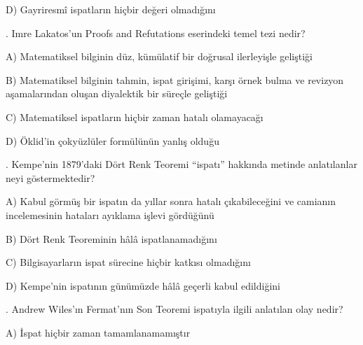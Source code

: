 \par\noindent\hspace*{1.6em}D) Gayriresmî ispatların hiçbir değeri olmadığını

\par\smallskip{}. Imre Lakatos’un Proofs and Refutations eserindeki temel tezi nedir?

\par\noindent\hspace*{1.6em}A) Matematiksel bilginin düz, kümülatif bir doğrusal ilerleyişle geliştiği

\par\noindent\hspace*{1.6em}B) Matematiksel bilginin tahmin, ispat girişimi, karşı örnek bulma ve revizyon aşamalarından oluşan diyalektik bir süreçle geliştiği

\par\noindent\hspace*{1.6em}C) Matematiksel ispatların hiçbir zaman hatalı olamayacağı

\par\noindent\hspace*{1.6em}D) Öklid’in çokyüzlüler formülünün yanlış olduğu

\par\smallskip{}. Kempe’nin 1879’daki Dört Renk Teoremi “ispatı” hakkında metinde anlatılanlar neyi göstermektedir?

\par\noindent\hspace*{1.6em}A) Kabul görmüş bir ispatın da yıllar sonra hatalı çıkabileceğini ve camianın incelemesinin hataları ayıklama işlevi gördüğünü

\par\noindent\hspace*{1.6em}B) Dört Renk Teoreminin hâlâ ispatlanamadığını

\par\noindent\hspace*{1.6em}C) Bilgisayarların ispat sürecine hiçbir katkısı olmadığını

\par\noindent\hspace*{1.6em}D) Kempe’nin ispatının günümüzde hâlâ geçerli kabul edildiğini

\par\smallskip{}. Andrew Wiles’ın Fermat’nın Son Teoremi ispatıyla ilgili anlatılan olay nedir?

\par\noindent\hspace*{1.6em}A) İspat hiçbir zaman tamamlanamamıştır

